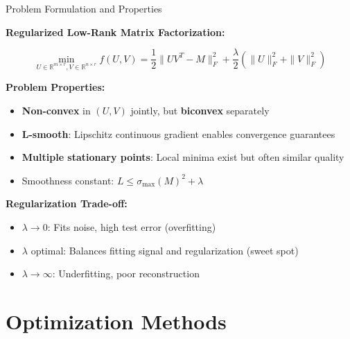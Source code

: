 \documentclass[aspectratio=169,usenames,dvipsnames]{beamer}
\begin{document}
\begin{frame}{Problem Formulation and Properties}
    
    \textbf{Regularized Low-Rank Matrix Factorization:}
    
    \begin{equation}
        \min_{U \in \mathbb{R}^{m \times r}, V \in \mathbb{R}^{n \times r}} 
        f(U, V) = \frac{1}{2}\|UV^T - M\|_F^2 + \frac{\lambda}{2}(\|U\|_F^2 + \|V\|_F^2)
    \end{equation}
    
    \vspace{0.3cm}
    
    \textbf{Problem Properties:}
    \begin{itemize}
        \item \textcolor{emoryblue}{\textbf{Non-convex}} in $(U, V)$ jointly, but \textbf{biconvex} separately
        \item \textcolor{emoryblue}{\textbf{L-smooth}}: Lipschitz continuous gradient enables convergence guarantees
        \item \textcolor{emoryblue}{\textbf{Multiple stationary points}}: Local minima exist but often similar quality
        \item Smoothness constant: $L \leq \sigma_{\max}(M)^2 + \lambda$
    \end{itemize}
    
    \vspace{0.3cm}
    
    \textbf{Regularization Trade-off:}
    \begin{itemize}
        \item $\lambda \to 0$: Fits noise, high test error (overfitting)
        \item $\lambda$ optimal: Balances fitting signal and regularization (sweet spot)
        \item $\lambda \to \infty$: Underfitting, poor reconstruction
    \end{itemize}
\end{frame}

\section{Optimization Methods}
\end{document}

